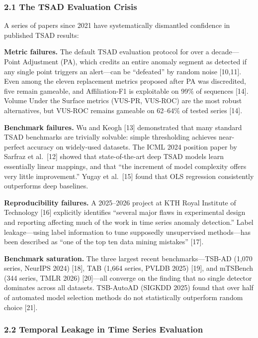 \documentclass[
]{article}
\begin{document}
\subsubsection{2.1 The TSAD Evaluation
Crisis}\label{the-tsad-evaluation-crisis}

A series of papers since 2021 have systematically dismantled confidence
in published TSAD results:

\textbf{Metric failures.} The default TSAD evaluation protocol for over
a decade---Point Adjustment (PA), which credits an entire anomaly
segment as detected if any single point triggers an alert---can be
``defeated'' by random noise {[}10,11{]}. Even among the eleven
replacement metrics proposed after PA was discredited, five remain
gameable, and Affiliation-F1 is exploitable on 99\% of sequences
{[}14{]}. Volume Under the Surface metrics (VUS-PR, VUS-ROC) are the
most robust alternatives, but VUS-ROC remains gameable on 62--64\% of
tested series {[}14{]}.

\textbf{Benchmark failures.} Wu and Keogh {[}13{]} demonstrated that
many standard TSAD benchmarks are trivially solvable: simple
thresholding achieves near-perfect accuracy on widely-used datasets. The
ICML 2024 position paper by Sarfraz et al.~{[}12{]} showed that
state-of-the-art deep TSAD models learn essentially linear mappings, and
that ``the increment of model complexity offers very little
improvement.'' Yugay et al.~{[}15{]} found that OLS regression
consistently outperforms deep baselines.

\textbf{Reproducibility failures.} A 2025--2026 project at KTH Royal
Institute of Technology {[}16{]} explicitly identifies ``several major
flaws in experimental design and reporting affecting much of the work in
time series anomaly detection.'' Label leakage---using label information
to tune supposedly unsupervised methods---has been described as ``one of
the top ten data mining mistakes'' {[}17{]}.

\textbf{Benchmark saturation.} The three largest recent
benchmarks---TSB-AD (1,070 series, NeurIPS 2024) {[}18{]}, TAB (1,664
series, PVLDB 2025) {[}19{]}, and mTSBench (344 series, TMLR 2026)
{[}20{]}---all converge on the finding that no single detector dominates
across all datasets. TSB-AutoAD (SIGKDD 2025) found that over half of
automated model selection methods do not statistically outperform random
choice {[}21{]}.

\subsubsection{2.2 Temporal Leakage in Time Series
Evaluation}\label{temporal-leakage-in-time-series-evaluation}
\end{document}
